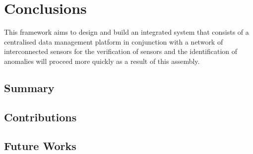 \chapter{Conclusions}

This framework aims  to design and build an integrated system that consists of a centralised data management platform in conjunction with a network of interconnected sensors for the verification of sensors and the identification of anomalies will proceed more quickly as a result of this assembly.

\section{Summary}
\lipsum[1-3]

\section{Contributions}
\lipsum[1-3]

\section{Future Works}
\lipsum[1-3]